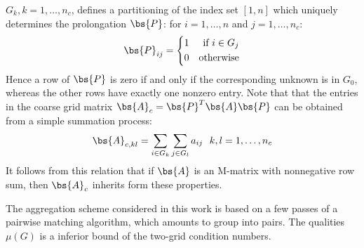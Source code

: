 $G_k,k=1,\hdots,n_c$, defines a partitioning of the index set $[1,n]$ which
uniquely determines the prolongation $\bs{P}$: for $i=1,\hdots,n$ and
$j=1,\hdots,n_c$:
\begin{equation}
\bs{P}_{ij} = \left\{
\begin{aligned}
&1 & \textrm{if }i\in G_j\\
&0 & \textrm{otherwise}
\end{aligned}
\right.
\end{equation}
Hence a row of $\bs{P}$ is zero if and only if the corresponding unknown is in
$G_0$, whereas the other rows have exactly one nonzero entry. Note that that
the entries in the coarse grid matrix $\bs{A}_c=\bs{P}^T\bs{A}\bs{P}$ can be
obtained from a simple summation process:
\begin{equation}
\bs{A}_{c,kl} = \sum_{i\in G_k} \sum_{j\in G_l} a_{ij} \ \ k,l=1,\hdots,n_c
\end{equation}
It follows from this relation that if $\bs{A}$ is an M-matrix with nonnegative
row sum, then $\bs{A}_c$ inherits form these properties.

The aggregation scheme considered in this work is based on a few passes of a
pairwise matching algorithm, which amounts to group into pairs. The qualities
$\mu(G)$ is a inferior bound of the two-grid condition numbers.

